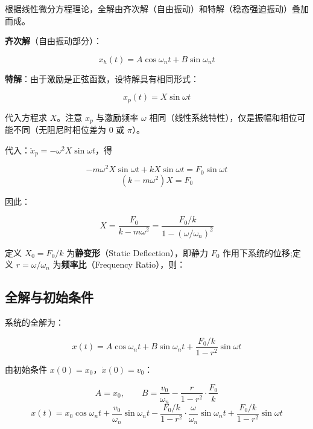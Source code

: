 根据线性微分方程理论，全解由齐次解（自由振动）和特解（稳态强迫振动）叠加而成。

\textbf{齐次解}（自由振动部分）：
\begin{myformula}
    \[
    x_h(t) = A\cos\omega_n t + B\sin\omega_n t
    \]
\end{myformula}

\textbf{特解}：由于激励是正弦函数，设特解具有相同形式：
\begin{myformula}
    \[
    x_p(t) = X\sin\omega t
    \]
\end{myformula}

代入方程求 $X$。注意 $x_p$ 与激励频率 $\omega$ 相同（线性系统特性），仅是振幅和相位可能不同（无阻尼时相位差为 0 或 $\pi$）。

代入：$\ddot{x}_p = -\omega^2 X\sin\omega t$，得
\begin{myformula}
    \[
    -m\omega^2 X\sin\omega t + kX\sin\omega t = F_0\sin\omega t
    \]
    \[
    (k - m\omega^2)X = F_0
    \]
\end{myformula}

因此：
\begin{myformula}
    \[
    X = \frac{F_0}{k - m\omega^2} = \frac{F_0/k}{1 - (\omega/\omega_n)^2}
    \]
\end{myformula}

定义 $X_0 = F_0/k$ 为\textbf{静变形}（Static Deflection），即静力 $F_0$ 作用下系统的位移;定义 $r = \omega/\omega_n$ 为\textbf{频率比}（Frequency Ratio），则：
\begin{myformula}
    \end{myformula}

\subsection{全解与初始条件}

系统的全解为：
\begin{myformula}
    \[
    x(t) = A\cos\omega_n t + B\sin\omega_n t + \frac{F_0/k}{1 - r^2}\sin\omega t
    \]
\end{myformula}

由初始条件 $x(0) = x_0$，$\dot{x}(0) = v_0$：
\begin{myformula}
    \[
    A = x_0,\qquad B = \frac{v_0}{\omega_n} - \frac{r}{1-r^2}\cdot\frac{F_0}{k}
    \]
    \[
    x(t) = x_0\cos\omega_n t + \frac{v_0}{\omega_n}\sin\omega_n t
           - \frac{F_0/k}{1-r^2}\cdot\frac{\omega}{\omega_n}\sin\omega_n t
           + \frac{F_0/k}{1-r^2}\sin\omega t
    \]
\end{myformula}

